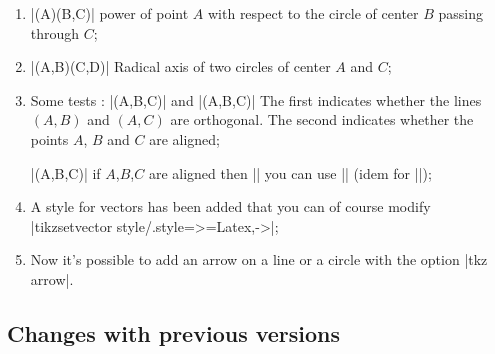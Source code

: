 \begin{itemize}
\begin{enumerate}
  |\tkzDotProduct(A,B,C)=aa'+bb' if vec{AB} =(a,b) and vec{AC} =(a',b')|
  
  
  \item |\tkzPowerCircle(A)(B,C)| power of point $A$ with respect to the circle of center $B$ passing through $C$;
  
  
  \item |\tkzDefRadicalAxis(A,B)(C,D)| Radical axis of two circles of center $A$ and $C$;
  
  
  \item Some tests : |\tkzIsOrtho(A,B,C)| and |\tkzIsLinear(A,B,C)| The first indicates whether the lines $(A,B)$ and $(A,C)$ are orthogonal. The second indicates whether the points $A$, $B$ and $C$ are aligned;

 |\tkzIsLinear(A,B,C)| if $A$,$B$,$C$ are aligned then |\tkzLineartrue|
  you can use |\iftkzLinear| (idem for |\tkzIsOrtho|);

\item A style for vectors has been added that you can of course modify
|tikzset{vector style/.style={>=Latex,->}}|;


\item Now it's possible to add an arrow on a line or a circle with the option |tkz arrow|. 
\end{enumerate}
\end{itemize}

\subsection{Changes with previous versions} %
\label{sub:changes_with_previous_versions}

